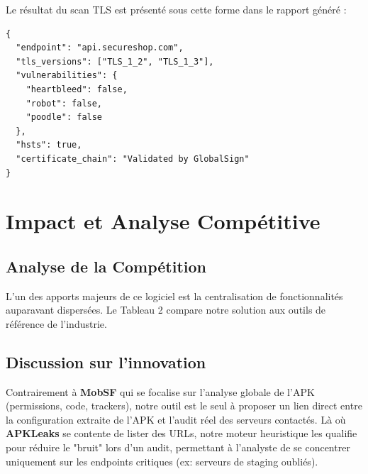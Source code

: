 \documentclass[11pt,a4paper]{article}
\begin{document}
Le résultat du scan TLS est présenté sous cette forme dans le rapport généré :

\begin{lstlisting}[caption=Exemple de sortie brute simplifiée du scan SSLyze]
{
  "endpoint": "api.secureshop.com",
  "tls_versions": ["TLS_1_2", "TLS_1_3"],
  "vulnerabilities": {
    "heartbleed": false,
    "robot": false,
    "poodle": false
  },
  "hsts": true,
  "certificate_chain": "Validated by GlobalSign"
}
\end{lstlisting}

\section{Impact et Analyse Compétitive}

\subsection{Analyse de la Compétition}
L'un des apports majeurs de ce logiciel est la centralisation de fonctionnalités auparavant dispersées. Le Tableau 2 compare notre solution aux outils de référence de l'industrie.

\begin{table}[H]
\centering
{}
\caption{Analyse comparative avec l'état de l'art.}
\end{table}

\subsection{Discussion sur l'innovation}
Contrairement à \textbf{MobSF} qui se focalise sur l'analyse globale de l'APK (permissions, code, trackers), notre outil est le seul à proposer un lien direct entre la configuration extraite de l'APK et l'audit réel des serveurs contactés. Là où \textbf{APKLeaks} se contente de lister des URLs, notre moteur heuristique les qualifie pour réduire le "bruit" lors d'un audit, permettant à l'analyste de se concentrer uniquement sur les endpoints critiques (ex: serveurs de staging oubliés).
\end{document}
